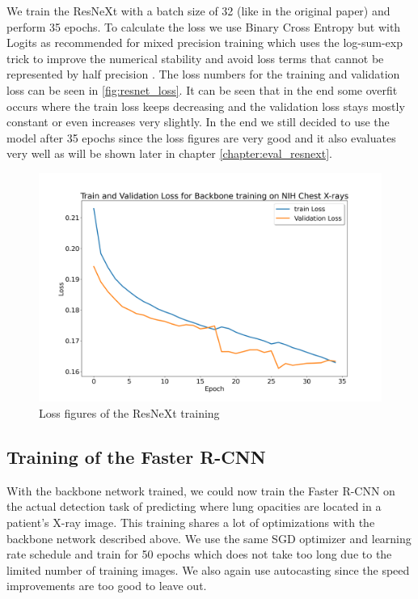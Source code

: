 We train the ResNeXt with a batch size of 32 (like in the original paper) and perform 35 epochs. To calculate the loss we use Binary Cross Entropy but with Logits as recommended for mixed precision training which uses the log-sum-exp trick to improve the numerical stability and avoid loss terms that cannot be represented by half precision \autocite{pytorch_team_automatic_nodate}. The loss numbers for the training and validation loss can be seen in \vref{fig:resnet_loss}. It can be seen that in the end some overfit occurs where the train loss keeps decreasing and the validation loss stays mostly constant or even increases very slightly. In the end we still decided to use the model after 35 epochs since the loss figures are very good and it also evaluates very well as will be shown later in chapter \vref{chapter:eval_resnext}.

\begin{figure}
	\centering
	\includegraphics[width=.7\linewidth]{img/loss_backbone_rcnn_35.png}
	\caption{Loss figures of the ResNeXt training}
	\label{fig:resnet_loss}
\end{figure}

\subsection*{Training of the Faster R-CNN}

With the backbone network trained, we could now train the Faster R-CNN on the actual detection task of predicting where lung opacities are located in a patient's X-ray image. This training shares a lot of optimizations with the backbone network described above. We use the same \ac{SGD} optimizer and learning rate schedule and train for 50 epochs which does not take too long due to the limited number of training images. We also again use autocasting since the speed improvements are too good to leave out.

